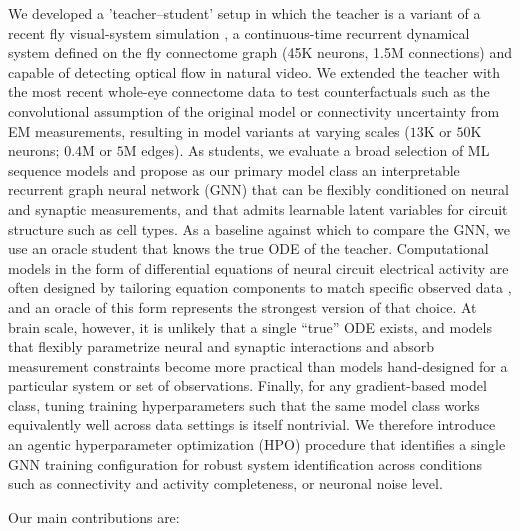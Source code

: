\documentclass{article}
\begin{document}
We developed a 'teacher--student' setup in which the teacher is a variant of a recent fly visual-system simulation \citep{Lappalainen2024-tq}, a continuous-time recurrent dynamical system defined on the fly connectome graph (45K neurons, 1.5M connections) and capable of detecting optical flow in natural video. We extended the teacher with the most recent whole-eye connectome data \citep{Dorkenwald2024-ni, Schlegel2024-qh} to test counterfactuals such as the convolutional assumption of the original model or connectivity uncertainty from EM measurements, resulting in model variants at varying scales ($13$K or $50$K neurons; $0.4$M or $5$M edges).
As students, we evaluate a broad selection of ML sequence models and propose as our primary model class an interpretable recurrent graph neural network (GNN) that can be flexibly conditioned on neural and synaptic measurements, and that admits learnable latent variables for circuit structure such as cell types.
As a baseline against which to compare the GNN, we use an oracle student that knows the true ODE of the teacher. Computational models in the form of differential equations of neural circuit electrical activity are often designed by tailoring equation components to match specific observed data \citep{Abbott1999-sh, Hodgkin1952-eq}, and an oracle of this form represents the strongest version of that choice. At brain scale, however, it is unlikely that a single ``true'' ODE exists, and models that flexibly parametrize neural and synaptic interactions and absorb measurement constraints become more practical than models hand-designed for a particular system or set of observations.
Finally, for any gradient-based model class, tuning training hyperparameters such that the same model class works equivalently well across data settings is itself nontrivial. We therefore introduce an agentic hyperparameter optimization (HPO) procedure that identifies a single GNN training configuration for robust system identification across conditions such as connectivity and activity completeness, or neuronal noise level.

Our main contributions are:
\end{document}
